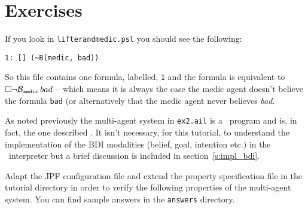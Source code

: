 \section{Exercises}
If you look in \texttt{lifterandmedic.psl} you should see the following:
\begin{verbatim}
1: [] (~B(medic, bad))
\end{verbatim}
So this file contains one formula, labelled, \texttt{1} and the formula is equivalent to $\Box \neg \mathrm{{\cal B}}_{\texttt{medic}} \, bad$\index{$\lbeliefop$} -- which means it is always the case the medic agent doesn't believe the formula \texttt{bad} (or alternatively that the medic agent never believes \emph{bad}.

As noted previously the multi-agent system in \texttt{ex2.ail} is a \gwendolen\ program and is, in fact, the one described .  It isn't necessary, for this tutorial, to understand the implementation of the BDI modalities (belief, goal, intention etc.) in the \gwendolen\ interpreter but a brief discussion is included in section~\ref{s:impl_bdi}.

Adapt the JPF configuration file and extend the property specification file in the tutorial directory in order to verify the following properties of the multi-agent system.  You can find sample answers in the \texttt{answers} directory.

